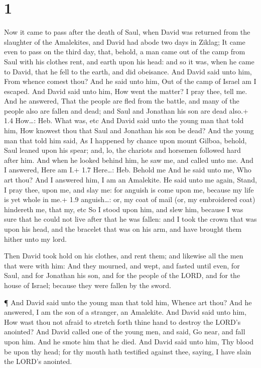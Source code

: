 \hypertarget{section}{%
\section{1}\label{section}}

 Now it came to pass after the death of Saul, when David was
returned from the slaughter of the Amalekites, and David had abode two
days in Ziklag;  It came even to pass on the third day,
that, behold, a man came out of the camp from Saul with his clothes
rent, and earth upon his head: and so it was, when he came to David,
that he fell to the earth, and did obeisance.  And David
said unto him, From whence comest thou? And he said unto him, Out of the
camp of Israel am I escaped.  And David said unto him, How
went the matter? I pray thee, tell me. And he answered, That the people
are fled from the battle, and many of the people also are fallen and
dead; and Saul and Jonathan his son are dead also.+ 1.4 How\ldots: Heb.
What was, etc  And David said unto the young man that told
him, How knowest thou that Saul and Jonathan his son be dead?
 And the young man that told him said, As I happened by
chance upon mount Gilboa, behold, Saul leaned upon his spear; and, lo,
the chariots and horsemen followed hard after him.  And when
he looked behind him, he saw me, and called unto me. And I answered,
Here am I.+ 1.7 Here\ldots: Heb. Behold me  And he said unto
me, Who art thou? And I answered him, I am an Amalekite.  He
said unto me again, Stand, I pray thee, upon me, and slay me: for
anguish is come upon me, because my life is yet whole in me.+ 1.9
anguish\ldots: or, my coat of mail (or, my embroidered coat) hindereth
me, that my, etc  So I stood upon him, and slew him,
because I was sure that he could not live after that he was fallen: and
I took the crown that was upon his head, and the bracelet that was on
his arm, and have brought them hither unto my lord.

 Then David took hold on his clothes, and rent them; and
likewise all the men that were with him:  And they mourned,
and wept, and fasted until even, for Saul, and for Jonathan his son, and
for the people of the LORD, and for the house of Israel; because they
were fallen by the sword.

 ¶ And David said unto the young man that told him, Whence
art thou? And he answered, I am the son of a stranger, an Amalekite.
 And David said unto him, How wast thou not afraid to
stretch forth thine hand to destroy the LORD's anointed? 
And David called one of the young men, and said, Go near, and fall upon
him. And he smote him that he died.  And David said unto
him, Thy blood be upon thy head; for thy mouth hath testified against
thee, saying, I have slain the LORD's anointed.


